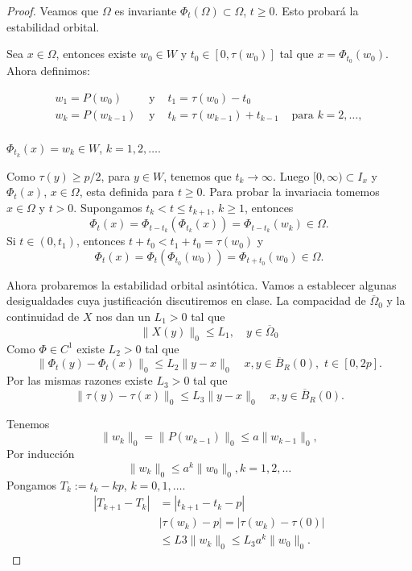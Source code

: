 \begin{proof}
Veamos que $\Omega$ es invariante $\Phi_t(\Omega)\subset\Omega$, $t\geq 0$. Esto probará la estabilidad orbital. 

Sea $x\in\Omega$, entonces existe $w_0\in W$ y $t_0\in[0,\tau(w_0)]$ tal que $x=\Phi_{t_0}(w_0)$. Ahora definimos:

\[
 \begin{array}{cccc}
 w_{1}=P(w_{0})  &  \text{ y }  &    t_1=\tau(w_{0})-t_{0}     &  \\
    w_{k}=P(w_{k-1})  &  \text{ y }  &    t_k=\tau(w_{k-1})+t_{k-1}     &      \text{ para } k=2,\ldots,\\
 \end{array}
\]




\begin{ejercicio} $\Phi_{t_k}(x)=w_k\in W$, $k=1,2,\ldots$.
 \end{ejercicio}


Como $\tau(y)\geq p/2$, para $y\in W$, tenemos que $t_k\to\infty$. Luego $[0,\infty)\subset I_x$ y $\Phi_t(x)$, $x\in\Omega$, esta definida para $t\geq 0$. Para probar la 
invariacia tomemos $x\in\Omega$ y $t>0$. Supongamos $t_k<t\leq t_{k+1}$, $k\geq 1$, entonces
\[
 \Phi_t(x)=\Phi_{t-t_k}\left(\Phi_{t_k}(x)\right)=\Phi_{t-t_k}(w_k)\in\Omega.
\]
Si $t\in (0,t_1)$, entonces $t+t_0<t_1+t_0=\tau(w_0)$ y 
\[
 \Phi_t(x)=\Phi_{t}\left(\Phi_{t_0}(w_0)\right)=\Phi_{t+t_0}(w_0)\in\Omega.
\]

Ahora probaremos la estabilidad orbital asintótica.  Vamos a establecer algunas desigualdades cuya justificación discutiremos en clase. La compacidad de
$\overline{\Omega}_0$ y la continuidad de $X$ nos dan un $L_1>0$ tal que
\[\|X(y)\|_0\leq L_1, \quad y\in\overline{\Omega}_0\]
Como $\Phi\in C^1$ existe $L_2>0$ tal  que 
\[\|\Phi_t(y)-\Phi_t(x)\|_0\leq L_2\|y-x\|_0\quad x,y\in \overline{B}_R(0),\,\, t\in[0,2p].\]
Por las mismas razones existe $L_3>0$ tal  que 
\[\|\tau(y)-\tau(x)\|_0\leq L_3\|y-x\|_0\quad x,y\in \overline{B}_R(0).\] 


Tenemos
\[\|w_k\|_0=\|P(w_{k-1})\|_0\leq a\|w_{k-1}\|_0,\]
Por inducción
\[\|w_k\|_0 \leq a^k\|w_{0}\|_0, k=1,2,\ldots\]
Pongamos $T_k:=t_k-kp$, $k=0,1,\ldots$.
\[\begin{split}
   |T_{k+1}-T_k|&=|t_{k+1}-t_k-p|\\
   &|\tau(w_k)-p|=|\tau(w_k)-\tau(0)|\\
   &\leq L3\|w_k\|_0\leq L_3a^k\|w_0\|_0.
  \end{split}
\]




\end{proof}
